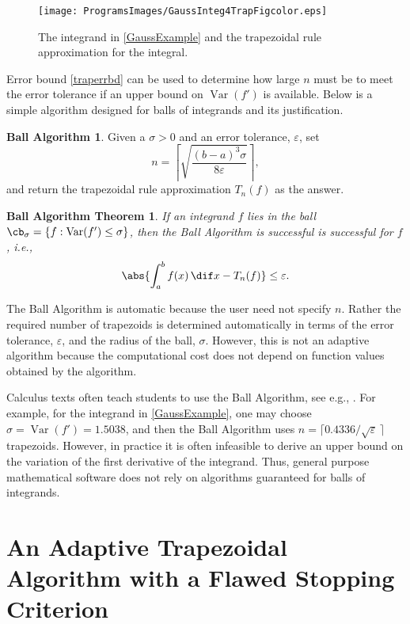 \documentclass[]{article}
\DeclareMathOperator{\Var}{Var}
\newtheorem*{ballthm}{Ball Algorithm Theorem}
\theoremstyle{definition}
\newtheorem*{ballalgo}{Ball Algorithm}
\theoremstyle{remark}
\begin{document}
\begin{figure}
\centering 
\texttt{[image: ProgramsImages/GaussInteg4TrapFigcolor.eps]}
\caption{The integrand in \eqref{GaussExample} and the trapezoidal rule approximation for the integral. \label{Gausstrapfig}}
\end{figure}

Error bound \eqref{traperrbd} can be used to determine how large $n$ must be to meet the error tolerance if an upper bound on $\Var(f')$ is available. Below is a simple algorithm designed for balls of integrands and its justification.

\begin{ballalgo} Given a $\sigma>0$ and an error tolerance, $\varepsilon$, set 
\begin{equation}\label{algo1n}
n = \left \lceil \sqrt{\frac{(b-a)^3 \sigma}{8\varepsilon}} \right \rceil,
\end{equation}
and return the trapezoidal rule approximation $T_n(f)$ as the answer.
\end{ballalgo}
\begin{ballthm} If an integrand $f$ lies in the ball $\cb_{\sigma}=\{f : \Var(f') \le \sigma\}$, then the Ball Algorithm is successful is successful for $f$, i.e., 
\[
\abs{\int_a^b f(x) \, \dif x - T_n(f)}\le \varepsilon.
\]
\end{ballthm}

The Ball Algorithm is automatic because the user need not specify $n$.  Rather the required number of trapezoids is determined automatically in terms of the error tolerance, $\varepsilon$, and the radius of the ball, $\sigma$.  However, this is not an adaptive algorithm because the computational cost does not depend on function values obtained by the algorithm.

Calculus texts often teach students to use the Ball Algorithm, see e.g., \cite{???}.  For example, for the integrand in \eqref{GaussExample}, one may choose $\sigma=\Var(f')=1.5038$, and then the Ball Algorithm uses $n = \lceil 0.4336/\sqrt{\varepsilon}\, \rceil$ trapezoids.  However, in practice it is often infeasible to derive an upper bound on the variation of the first derivative of the integrand.  Thus, general purpose mathematical software does not rely on algorithms guaranteed for balls of integrands.

\section{An Adaptive Trapezoidal Algorithm with a Flawed Stopping Criterion} \label{flawstopsec}
\end{document}
